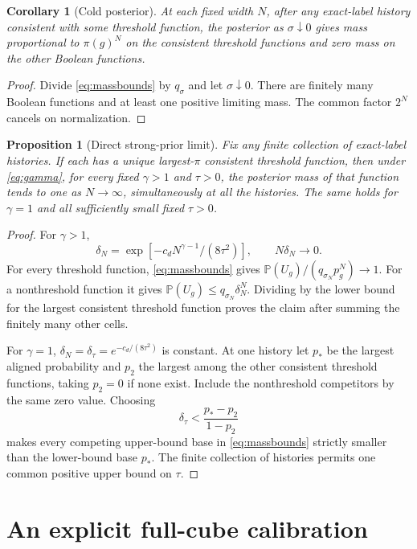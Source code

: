 \documentclass[11pt]{article}
\newtheorem{proposition}[theorem]{Proposition}
\newtheorem{corollary}[theorem]{Corollary}
\newcommand{\Pp}{\mathbb P}
\begin{document}
\begin{corollary}[Cold posterior]\label{cor:cold}
At each fixed width $N$, after any exact-label history consistent with
some threshold function, the posterior as $\sigma\downarrow0$ gives
mass proportional to $\pi(g)^N$ on the consistent threshold functions
and zero mass on the other Boolean functions.
\end{corollary}
\begin{proof}
Divide \eqref{eq:massbounds} by $q_\sigma$ and let $\sigma\downarrow0$.
There are finitely many Boolean functions and at least one positive
limiting mass. The common factor $2^N$ cancels on normalization.
\end{proof}

\begin{proposition}[Direct strong-prior limit]\label{prop:gamma}
Fix any finite collection of exact-label histories. If each has a unique
largest-$\pi$ consistent threshold function, then under
\eqref{eq:gamma}, for every fixed $\gamma>1$ and $\tau>0$, the posterior
mass of that function tends to one as $N\to\infty$, simultaneously
at all the histories. The same holds for $\gamma=1$ and all sufficiently
small fixed $\tau>0$.
\end{proposition}
\begin{proof}
For $\gamma>1$,
\[
 \delta_N=\exp[-c_dN^{\gamma-1}/(8\tau^2)],\qquad
 N\delta_N\longrightarrow0.
\]
For every threshold function, \eqref{eq:massbounds} gives
$\Pp(U_g)/(q_{\sigma_N}p_g^N)\to1$.
For a nonthreshold function it gives
$\Pp(U_g)\le q_{\sigma_N}\delta_N^N$.
Dividing by the lower bound for the largest consistent threshold
function proves the claim after summing the finitely many other cells.

For $\gamma=1$, $\delta_N=\delta_\tau=e^{-c_d/(8\tau^2)}$ is constant.
At one history let $p_*$ be the largest aligned probability and $p_2$
the largest among the other consistent threshold functions, taking
$p_2=0$ if none exist. Include the nonthreshold competitors by the same
zero value. Choosing
\[
 \delta_\tau<\frac{p_*-p_2}{1-p_2}
\]
makes every competing upper-bound base in \eqref{eq:massbounds}
strictly smaller than the lower-bound base $p_*$. The finite collection
of histories permits one common positive upper bound on $\tau$.
\end{proof}

\section{An explicit full-cube calibration}
\end{document}
